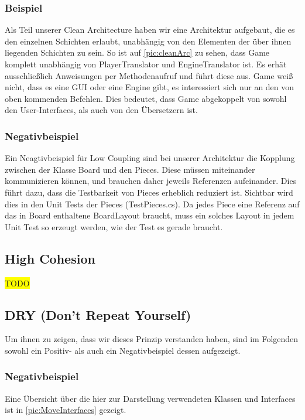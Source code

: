 \documentclass[
10pt, %
a4paper, %
oneside, %
headinclude,footinclude, %
BCOR5mm, %
]{scrartcl}
\begin{document}
\begin{onehalfspace}
\subsubsection{Beispiel}
Als Teil unserer Clean Architecture haben wir eine Architektur aufgebaut, die es den einzelnen Schichten erlaubt, unabhängig von den Elementen der über ihnen liegenden Schichten zu sein. So ist auf \autoref{pic:cleanArc} zu sehen, dass Game komplett unabhängig von PlayerTranslator und EngineTranslator ist. Es erhät ausschließlich Anweisungen per Methodenaufruf und führt diese aus. Game weiß nicht, dass es eine GUI oder eine Engine gibt, es interessiert sich nur an den von oben kommenden Befehlen. Dies bedeutet, dass Game abgekoppelt von sowohl den User-Interfaces, als auch von den Übersetzern ist.

\subsubsection{Negativbeispiel}
Ein Neagtivbeispiel für Low Coupling sind bei unserer Architektur die Kopplung zwischen der Klasse Board und den Pieces. Diese müssen miteinander kommunizieren können, und brauchen daher jeweils Referenzen aufeinander. Dies führt dazu, dass die Testbarkeit von Pieces erheblich reduziert ist. Sichtbar wird dies in den Unit Tests der Pieces (TestPieces.cs). Da jedes Piece eine Referenz auf das in Board enthaltene BoardLayout braucht, muss ein solches Layout in jedem Unit Test so erzeugt werden, wie der Test es gerade braucht.

\subsection{High Cohesion}
\colorbox{yellow}{TODO}

\subsection{DRY (Don't Repeat Yourself)}
Um ihnen zu zeigen, dass wir dieses Prinzip verstanden haben, sind im Folgenden sowohl ein Positiv- als auch ein Negativbeispiel dessen aufgezeigt. 

\subsubsection{Negativbeispiel}
Eine Übersicht über die hier zur Darstellung verwendeten Klassen und Interfaces ist in \autoref{pic:MoveInterfaces} gezeigt.


\end{onehalfspace}
\end{document}
